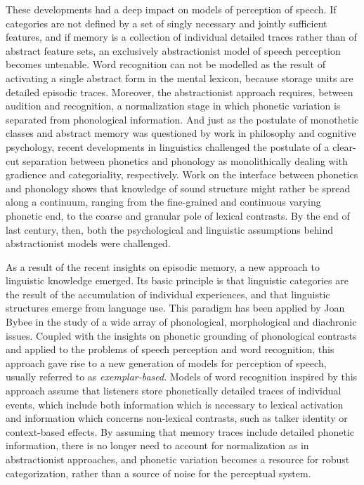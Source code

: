 These developments had a deep impact on models of perception of speech. If categories are not defined by a set of singly necessary and jointly sufficient features, and if memory is a collection of individual detailed traces rather than of abstract feature sets, an exclusively abstractionist model of speech perception becomes untenable. Word recognition can not be modelled as the result of activating a single abstract form in the mental lexicon, because storage units are detailed episodic traces. Moreover, the abstractionist approach requires, between audition and recognition, a normalization stage in which phonetic variation is separated from phonological information. And just as the postulate of monothetic classes and abstract memory was questioned by work in philosophy and cognitive psychology, recent developments in linguistics challenged the postulate of a clear-cut separation between phonetics and phonology as monolithically dealing with gradience and categoriality, respectively. Work on the interface between phonetics and phonology shows that knowledge of sound structure might rather be spread along a continuum, ranging from the fine-grained and continuous varying phonetic end, to the coarse and granular pole of lexical contrasts. By the end of last century, then, both the psychological and linguistic assumptions behind abstractionist models were challenged.

As a result of the recent insights on episodic memory, a new approach to linguistic knowledge emerged. Its basic principle is that linguistic categories are the result of the accumulation of individual experiences, and that linguistic structures emerge from language use. This paradigm has been applied by Joan Bybee in the study of a wide array of phonological, morphological and diachronic issues. Coupled with the insights on phonetic grounding of phonological contrasts and applied to the problems of speech perception and word recognition, this approach gave rise to a new generation of models for perception of speech, usually referred to as \textit{exemplar-based}. Models of word recognition inspired by this approach assume that listeners store phonetically detailed traces of individual events, which include both information which is necessary to lexical activation and information which concerns non-lexical contrasts, such as talker identity or context-based effects. By assuming that memory traces include detailed phonetic information, there is no longer need to account for normalization as in abstractionist approaches, and phonetic variation becomes a resource for robust categorization, rather than a source of noise for the perceptual system.

